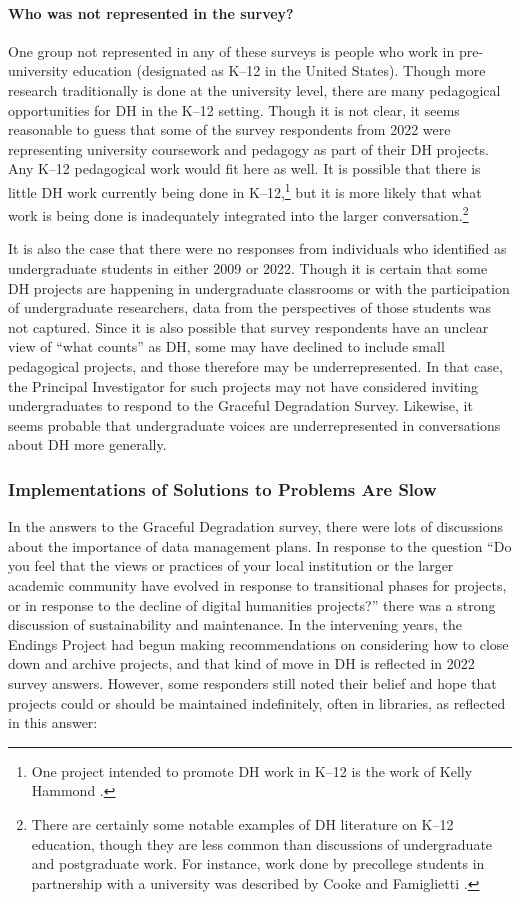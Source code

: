\documentclass[final]{anthology-ch}
\begin{document}
\paragraph{Who was not represented in the survey?}
One group not represented in any of these surveys is people who work in pre-university education (designated as K--12 in the United States). Though more research traditionally is done at the university level, there are many pedagogical opportunities for DH in the K--12 setting. Though it is not clear, it seems reasonable to guess that some of the survey respondents from 2022 were representing university coursework and pedagogy as part of their DH projects. Any K--12 pedagogical work would fit here as well. It is possible that there is little DH work currently being done in K--12,\footnote{One project intended to promote DH work in K--12 is the work of Kelly Hammond \cite{hammond2022k12}.} but it is more likely that what work is being done is inadequately integrated into the larger conversation.\footnote{There are certainly some notable examples of DH literature on K--12 education, though they are less common than discussions of undergraduate and postgraduate work. For instance, work done by precollege students in partnership with a university was described by Cooke and Famiglietti \cite{cooke2023k12dh}.}

It is also the case that there were no responses from individuals who identified as undergraduate students in either 2009 or 2022. Though it is certain that some DH projects are happening in undergraduate classrooms or with the participation of undergraduate researchers, data from the perspectives of those students was not captured. Since it is also possible that survey respondents have an unclear view of \enquote{what counts} as DH, some may have declined to include small pedagogical projects, and those therefore may be underrepresented. In that case, the Principal Investigator for such projects may not have considered inviting undergraduates to respond to the Graceful Degradation Survey. Likewise, it seems probable that undergraduate voices are underrepresented in conversations about DH more generally.

\subsubsection{Implementations of Solutions to Problems Are Slow}

In the answers to the Graceful Degradation survey, there were lots of discussions about the importance of data management plans. In response to the question \enquote{Do you feel that the views or practices of your local institution or the larger academic community have evolved in response to transitional phases for projects, or in response to the decline of digital humanities projects?} there was a strong discussion of sustainability and maintenance. In the intervening years, the Endings Project had begun making recommendations on considering how to close down and archive projects, and that kind of move in DH is reflected in 2022 survey answers. However, some responders still noted their belief and hope that projects could or should be maintained indefinitely, often in libraries, as reflected in this answer:
\end{document}
